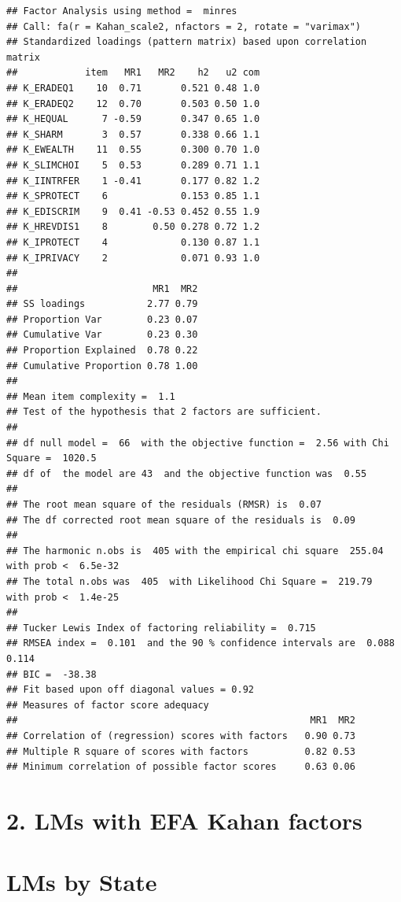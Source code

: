 \documentclass[
]{article}
\begin{document}
\begin{verbatim}
## Factor Analysis using method =  minres
## Call: fa(r = Kahan_scale2, nfactors = 2, rotate = "varimax")
## Standardized loadings (pattern matrix) based upon correlation matrix
##            item   MR1   MR2    h2   u2 com
## K_ERADEQ1    10  0.71       0.521 0.48 1.0
## K_ERADEQ2    12  0.70       0.503 0.50 1.0
## K_HEQUAL      7 -0.59       0.347 0.65 1.0
## K_SHARM       3  0.57       0.338 0.66 1.1
## K_EWEALTH    11  0.55       0.300 0.70 1.0
## K_SLIMCHOI    5  0.53       0.289 0.71 1.1
## K_IINTRFER    1 -0.41       0.177 0.82 1.2
## K_SPROTECT    6             0.153 0.85 1.1
## K_EDISCRIM    9  0.41 -0.53 0.452 0.55 1.9
## K_HREVDIS1    8        0.50 0.278 0.72 1.2
## K_IPROTECT    4             0.130 0.87 1.1
## K_IPRIVACY    2             0.071 0.93 1.0
## 
##                        MR1  MR2
## SS loadings           2.77 0.79
## Proportion Var        0.23 0.07
## Cumulative Var        0.23 0.30
## Proportion Explained  0.78 0.22
## Cumulative Proportion 0.78 1.00
## 
## Mean item complexity =  1.1
## Test of the hypothesis that 2 factors are sufficient.
## 
## df null model =  66  with the objective function =  2.56 with Chi Square =  1020.5
## df of  the model are 43  and the objective function was  0.55 
## 
## The root mean square of the residuals (RMSR) is  0.07 
## The df corrected root mean square of the residuals is  0.09 
## 
## The harmonic n.obs is  405 with the empirical chi square  255.04  with prob <  6.5e-32 
## The total n.obs was  405  with Likelihood Chi Square =  219.79  with prob <  1.4e-25 
## 
## Tucker Lewis Index of factoring reliability =  0.715
## RMSEA index =  0.101  and the 90 % confidence intervals are  0.088 0.114
## BIC =  -38.38
## Fit based upon off diagonal values = 0.92
## Measures of factor score adequacy             
##                                                    MR1  MR2
## Correlation of (regression) scores with factors   0.90 0.73
## Multiple R square of scores with factors          0.82 0.53
## Minimum correlation of possible factor scores     0.63 0.06
\end{verbatim}

\hypertarget{lms-with-efa-kahan-factors-1}{%
\section{2. LMs with EFA Kahan
factors}\label{lms-with-efa-kahan-factors-1}}

\newpage

\hypertarget{lms-by-state}{%
\section{LMs by State}\label{lms-by-state}}
\end{document}
